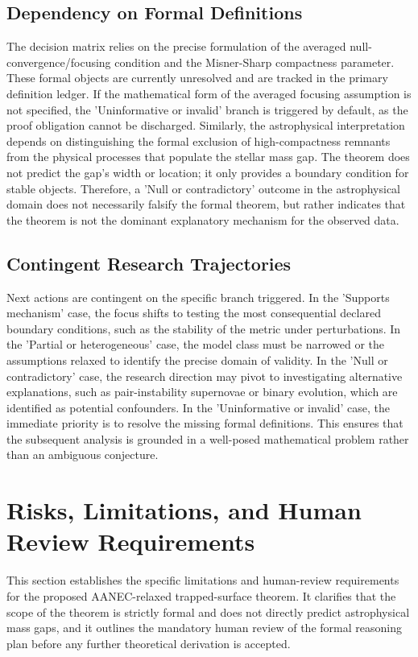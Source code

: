 \documentclass[conference]{IEEEtran}
\begin{document}
\subsection{Dependency on Formal Definitions}
The decision matrix relies on the precise formulation of the averaged null-convergence/focusing condition and the Misner-Sharp compactness parameter. These formal objects are currently unresolved and are tracked in the primary definition ledger. If the mathematical form of the averaged focusing assumption is not specified, the 'Uninformative or invalid' branch is triggered by default, as the proof obligation cannot be discharged. Similarly, the astrophysical interpretation depends on distinguishing the formal exclusion of high-compactness remnants from the physical processes that populate the stellar mass gap. The theorem does not predict the gap's width or location; it only provides a boundary condition for stable objects. Therefore, a 'Null or contradictory' outcome in the astrophysical domain does not necessarily falsify the formal theorem, but rather indicates that the theorem is not the dominant explanatory mechanism for the observed data.

\subsection{Contingent Research Trajectories}
Next actions are contingent on the specific branch triggered. In the 'Supports mechanism' case, the focus shifts to testing the most consequential declared boundary conditions, such as the stability of the metric under perturbations. In the 'Partial or heterogeneous' case, the model class must be narrowed or the assumptions relaxed to identify the precise domain of validity. In the 'Null or contradictory' case, the research direction may pivot to investigating alternative explanations, such as pair-instability supernovae or binary evolution, which are identified as potential confounders. In the 'Uninformative or invalid' case, the immediate priority is to resolve the missing formal definitions. This ensures that the subsequent analysis is grounded in a well-posed mathematical problem rather than an ambiguous conjecture.

\section{Risks, Limitations, and Human Review Requirements}
This section establishes the specific limitations and human-review requirements for the proposed AANEC-relaxed trapped-surface theorem. It clarifies that the scope of the theorem is strictly formal and does not directly predict astrophysical mass gaps, and it outlines the mandatory human review of the formal reasoning plan before any further theoretical derivation is accepted.
\end{document}
